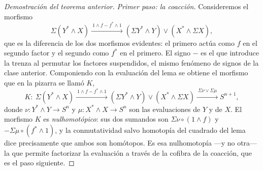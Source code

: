 \begin{proof}[Demostración del teorema anterior]
\emph{Primer paso: la coacción.} Consideremos el morfismo
\[
\Sigma(Y^*\wedge X)\xrightarrow{\ 1\wedge f-f^*\wedge1\ }(\Sigma Y^*\wedge Y)\vee(X^*\wedge\Sigma X),
\]
que es la diferencia de los dos morfismos evidentes: el primero actúa como $f$ en el segundo factor y el segundo como $f^*$ en el primero. El signo $-$ es el que introduce la trenza al permutar los factores suspendidos, el mismo fenómeno de signos de la clase anterior. Componiendo con la evaluación del lema se obtiene el morfismo que en la pizarra se llamó $K$,
\[
K\colon\ \Sigma(Y^*\wedge X)\xrightarrow{\ 1\wedge f-f^*\wedge1\ }(\Sigma Y^*\wedge Y)\vee(X^*\wedge\Sigma X)\xrightarrow{\ \Sigma\nu\vee\Sigma\mu\ }S^{n+1},
\]
donde $\nu\colon Y^*\wedge Y\to S^n$ y $\mu\colon X^*\wedge X\to S^n$ son las evaluaciones de $Y$ y de $X$. El morfismo $K$ es \emph{nulhomotópico}: sus dos sumandos son $\Sigma\nu\circ(1\wedge f)$ y $-\Sigma\mu\circ(f^*\wedge1)$, y la conmutatividad salvo homotopía del cuadrado del lema dice precisamente que ambos son homótopos. Es esa nulhomotopía ---y no otra--- la que permite factorizar la evaluación a través de la cofibra de la coacción, que es el paso siguiente.


\end{proof}
